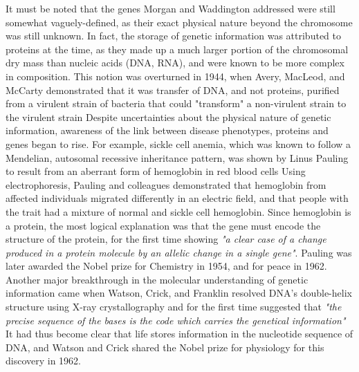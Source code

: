 It must be noted that the genes Morgan and Waddington addressed were still somewhat vaguely-defined, as their exact physical nature beyond the chromosome was still unknown. In fact, the storage of genetic information was attributed to proteins at the time, as they made up a much larger portion of the chromosomal dry mass than nucleic acids (DNA, RNA), and were known to be more complex in composition. This notion was overturned in 1944, when Avery, MacLeod, and McCarty demonstrated that it was transfer of DNA, and not proteins, purified from a virulent strain of bacteria that could "transform" a non-virulent strain to the virulent strain Despite uncertainties about the physical nature of genetic information, awareness of the link between disease phenotypes, proteins and genes began to rise. For example, sickle cell anemia, which was known to follow a Mendelian, autosomal recessive inheritance pattern, was shown by Linus Pauling to result from an aberrant form of hemoglobin in red blood cells Using electrophoresis, Pauling and colleagues demonstrated that hemoglobin from affected individuals migrated differently in an electric field, and that people with the trait had a mixture of normal and sickle cell hemoglobin. Since hemoglobin is a protein, the most logical explanation was that the gene must encode the structure of the protein, for the first time showing \textit{"a clear case of a change produced in a protein molecule by an allelic change in a single gene"}. Pauling was later awarded the Nobel prize for Chemistry in 1954, and for peace in 1962. Another major breakthrough in the molecular understanding of genetic information came when Watson, Crick, and Franklin resolved DNA's double-helix structure using X-ray crystallography and for the first time suggested that \textit{"the precise sequence of the bases is the code which carries the genetical information"} It had thus become clear that life stores information in the nucleotide sequence of DNA, and Watson and Crick shared the Nobel prize for physiology for this discovery in 1962.

